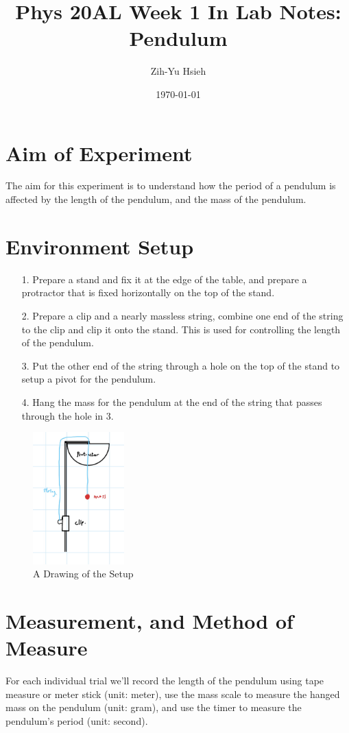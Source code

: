 \documentclass{article}
\title{Phys 20AL Week 1 In Lab Notes: Pendulum}
\author{Zih-Yu Hsieh}
\date{\today}
\begin{document}
\maketitle

\section{Aim of Experiment}
The aim for this experiment is to understand how the period of a pendulum is affected by the length of the pendulum, and the mass of the pendulum.

\section{Environment Setup}
\begin{itemize}
    \item[1.] Prepare a stand and fix it at the edge of the table, and prepare a protractor that is fixed horizontally on the top of the stand.
    \item[2.] Prepare a clip and a nearly massless string, combine one end of the string to the clip and clip it onto the stand. This is used for controlling the length of the pendulum.
    \item[3.] Put the other end of the string through a hole on the top of the stand to setup a pivot for the pendulum.
    \item[4.] Hang the mass for the pendulum at the end of the string that passes through the hole in 3.
\end{itemize}
\begin{figure}[h!]
    \begin{center}
        \includegraphics[width=100pt]{Setup Sketch.jpg}
        \caption{A Drawing of the Setup}
    \end{center}
\end{figure}

\section{Measurement, and Method of Measure}
For each individual trial we'll record the length of the pendulum using tape measure or meter stick (unit: meter), use the mass scale to measure the hanged mass on the pendulum (unit: gram), and use the timer to measure the pendulum's period (unit: second).
\end{document}
